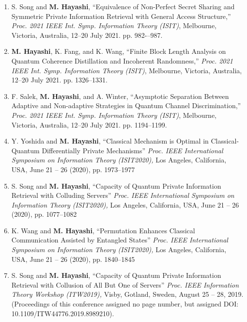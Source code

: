 \documentclass[a4paper,12pt,oneside]{article}
\begin{document}
\begin{enumerate}
    \item
    S. Song and \textbf{M. Hayashi}, 
    ``Equivalence of Non-Perfect Secret Sharing and Symmetric Private Information Retrieval with General Access Structure,''
    {\em Proc. 2021 IEEE Int. Symp. Information Theory (ISIT)}, 
    Melbourne, Victoria, Australia, 12–20 July 2021. pp. 982-–987.
    
    \item
    \textbf{M. Hayashi}, K. Fang, and K. Wang,
    ``Finite Block Length Analysis on Quantum
    Coherence Distillation and Incoherent Randomness,''
    {\em Proc. 2021 IEEE Int. Symp. Information Theory (ISIT)}, 
    Melbourne, Victoria, Australia, 12–20 July 2021. pp. 1326--1331.
    
    \item
    F. Salek, \textbf{M. Hayashi}, and A. Winter, 
    ``Asymptotic Separation Between Adaptive and Non-adaptive Strategies in Quantum Channel Discrimination,''
    {\em Proc. 2021 IEEE Int. Symp. Information Theory (ISIT)}, 
    Melbourne, Victoria, Australia, 12–20 July 2021. pp. 1194--1199.
    
    \item
    Y. Yoshida and \textbf{M. Hayashi}, 
    ``Classical Mechanism is Optimal in Classical-Quantum Differentially Private Mechanisms''
    {\em Proc. IEEE International Symposium on Information Theory (ISIT2020),} 
    Los Angeles, California, USA, June 21 -- 26 (2020), pp. 1973--1977
    
    \item
    S. Song and \textbf{M. Hayashi}, 
    ``Capacity of Quantum Private Information Retrieval with Colluding Servers''
    {\em Proc. IEEE International Symposium on Information Theory (ISIT2020),} 
    Los Angeles, California, USA, June 21 -- 26 (2020), pp. 1077--1082
    
    \item
    K. Wang and \textbf{M. Hayashi}, 
    ``Permutation Enhances Classical Communication Assisted by Entangled States''
    {\em Proc. IEEE International Symposium on Information Theory (ISIT2020),} 
    Los Angeles, California, USA, June 21 -- 26 (2020), pp. 1840--1845
    
    \item
    S. Song and \textbf{M. Hayashi}, 
    ``Capacity of Quantum Private Information Retrieval with Collusion of All But One of Servers''
    {\em Proc. IEEE Information Theory Workshop (ITW2019),} 
    Visby, Gotland, Sweden, August 25 -- 28, 2019. 
    (Proceedings of this conference assigned no page number, but assigned DOI: 10.1109/ITW44776.2019.8989210).
    

\end{enumerate}
\end{document}
